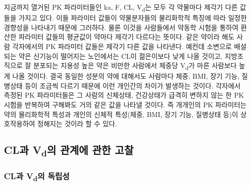 \documentclass[
  11pt,
  krantz2, a4paper, twoside]{krantz}
\begin{document}
지금까지 열거된 PK 파라미터들인 ka, F, CL, V\textsubscript{d}는 모두 각 약물마다
제각기 다른 값들을 가지고 있다. 이들 파라미터 값들이 약물분자들의
물리화학적 특징에 따라 일정한 경향성을 나타내기 때문에 그러하다. 물론
이것을 사람들에서 약동학 시험을 통하여 환산한 파라미터 값들의 평균값이
약마다 제각기 다르다는 뜻이다. 같은 약이라 해도 사람 각자에서의 PK
파라미터 값들은 제각기 다른 값을 나타낸다. 예컨데 소변으로 배설되는 약은
신기능이 떨어지는 노인에서는 CL이 젊은이보다 낮게 나올 것이고,
지방조직으로 잘 분포되는 지용성 높은 약은 비만한 사람에서 체중당 V\textsubscript{d}가
마른 사람보다 높게 나올 것이다. 결국 동일한 성분의 약에 대해서도
사람마다 체중, BMI, 장기 기능, 질병상태 등이 조금씩 다르기 때문에 이런
개인간의 차이가 발생하는 것이다. 각자에서 측정된 PK 파라미터들은 그
사람의 신체상태, 건강상태가 급격히 변하지 않는 한 PK 시험을 반복하여
구해봐도 거의 같은 값을 나타낼 것이다. 즉 개개인의 PK 파라미터는 약의
물리화학적 특성과 개인의 신체적 특성(체중, BMI, 장기 기능, 질병상태
등)이 상호작용하여 정해지는 것이라 할 수 있다.

\hypertarget{cluxacfc-vduxc758-uxad00uxacc4uxc5d0-uxad00uxd55c-uxace0uxcc30}{%
\subsection{\texorpdfstring{CL과 V\textsubscript{d}의 관계에 관한 고찰}{CL과 Vd의 관계에 관한 고찰}}\label{cluxacfc-vduxc758-uxad00uxacc4uxc5d0-uxad00uxd55c-uxace0uxcc30}}

\hypertarget{cluxacfc-vduxc758-uxb3c5uxb9bduxc131}{%
\subsubsection{\texorpdfstring{CL과 V\textsubscript{d}의 독립성}{CL과 Vd의 독립성}}\label{cluxacfc-vduxc758-uxb3c5uxb9bduxc131}}
\end{document}

